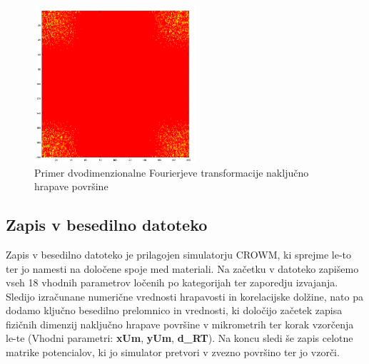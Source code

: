 \documentclass[a4paper,twoside,openright,12pt,slovene]{book}
\begin{document}
\begin{figure}[H]
    \centering
    \includegraphics[width=60mm]{Slike/FFT texture.png}
    \caption{Primer dvodimenzionalne Fourierjeve transformacije naključno hrapave površine}
    \label{fig:FFTPovršine}
\end{figure}

\subsection{Zapis v besedilno datoteko}
\label{zapisVBesedilo}

Zapis v besedilno datoteko je prilagojen simulatorju CROWM, ki sprejme le-to ter jo namesti na določene spoje med materiali. Na začetku v datoteko zapišemo vseh 18 vhodnih parametrov ločenih po kategorijah ter zaporedju izvajanja. Sledijo izračunane numerične vrednosti hrapavosti in korelacijske dolžine, nato pa dodamo ključno besedilno prelomnico in vrednosti, ki določijo začetek zapisa fizičnih dimenzij naključno hrapave površine v mikrometrih ter korak vzorčenja le-te (Vhodni parametri: \textbf{xUm}, \textbf{yUm}, \textbf{d\_RT}). Na koncu sledi še zapis celotne matrike potencialov, ki jo simulator pretvori v zvezno površino ter jo vzorči.\\
\end{document}

